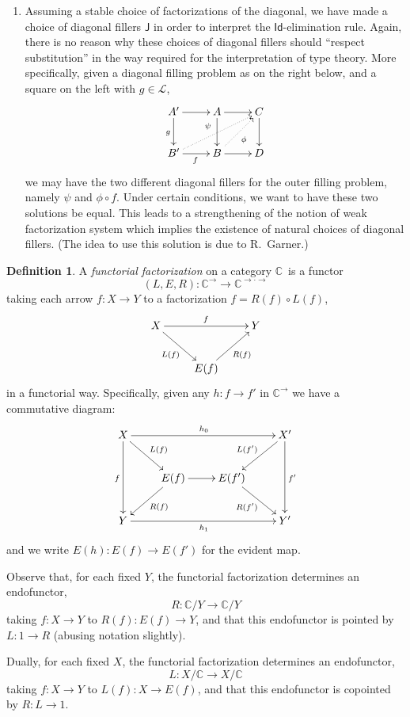 \documentclass[12pt]{article}
\newcommand{\C}{\ensuremath{\mathbb{C}}}
\renewcommand{\L}{\ensuremath{\mathcal{L}}}
\newcommand{\arr}{\ensuremath{\rightarrow}}
\newcommand{\Id}{\ensuremath{\mathsf{Id}}}
\theoremstyle{remark}
\theoremstyle{definition}
\newtheorem{definition}[theorem]{Definition}
\begin{document}
\begin{enumerate}
\item Assuming a stable choice of factorizations of the diagonal, we have made a choice of diagonal fillers $\mathsf{J}$ in order to interpret the $\Id$-elimination rule.  Again, there is no reason why these choices of diagonal fillers should ``respect substitution'' in the way required for the interpretation of type theory. 
More specifically, given a diagonal filling problem as on the right below, and a square on the left with $g\in\L$,
\begin{equation}\label{diagram:coherencefillers}
\xymatrix{
A' \ar[d]_g \ar[r] & A  \ar[d] \ar[r] & \ar[d] C \\
B' \ar[r]_{f} \ar@{..>}[rru]^{\psi\ \ } & B\ar@{..>}[ru]_{\phi} \ar[r] & D
}
\end{equation}
we may have the two different diagonal fillers for the outer filling problem, namely $\psi$ and $\phi\circ f$.  Under certain conditions, we want to have these two solutions be equal.
This leads to a strengthening of the notion of weak factorization system which implies the existence of natural choices of diagonal fillers. (The idea to use this solution is due to R.~Garner.)

\end{enumerate}

\begin{definition} A \emph{functorial factorization} on a category \C\ is a functor
\[
(L,E,R) : \C^{\arr} \to \C^{\arr\cdot\arr}
\]
taking each arrow $f : X \to Y$ to a factorization $f = R(f)\circ L(f)$,
\[
\xymatrix{
 X \ar[rr]^{f} \ar[rd]_{L(f)} && Y\\
& E(f) \ar[ru]_{R(f)}  &
}
\]
in a functorial way.  Specifically, given any $h : f \to f'$ in $\C^{\arr}$ we have a commutative diagram:
\[
\xymatrix{
X \ar[dd]_{f} \ar[rd]^{L(f)} \ar[rrr]^{h_0} &&& \ar[dd]^{f'} \ar[ld]_{L(f')} X'\\
   & E(f) \ar[r] \ar[ld]^{R(f)} & E(f') \ar[rd]_{R(f')} & \\
Y  \ar[rrr]_{h_1} &&&  Y'
}
\]
and we write $E(h) : E(f)\to E(f')$ for the evident map.
\end{definition}

Observe that, for each fixed $Y$, the functorial factorization determines an endofunctor, 
\[
R : \C/Y \to \C/Y
\]
taking $f:X\to Y$ to $R(f) :E(f) \to Y$, and that this endofunctor is pointed by $L : 1 \to R$ (abusing notation slightly).

Dually, for each fixed $X$, the functorial factorization determines an endo\-functor, 
\[
L : X/\C \to X/\C
\]
taking $f:X\to Y$ to $L(f) : X\to E(f)$, and that this endofunctor is copointed by $R : L \to 1$.
\end{document}
